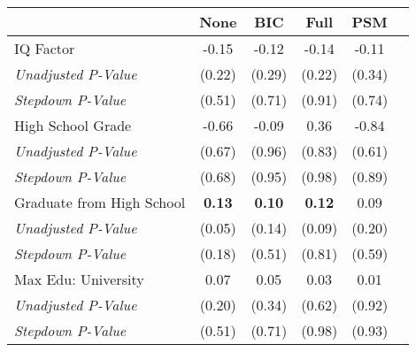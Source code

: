 \begin{tabular}{l c c c c c}
\toprule
 & None & BIC & Full & PSM \\
\midrule
IQ Factor & -0.15 & -0.12 & -0.14 & -0.11 \\
\quad \textit{Unadjusted P-Value} & (0.22) & (0.29) & (0.22) & (0.34) \\
\quad \textit{Stepdown P-Value} & (0.51) & (0.71) & (0.91) & (0.74) \\
High School Grade & -0.66 & -0.09 & 0.36 & -0.84 \\
\quad \textit{Unadjusted P-Value} & (0.67) & (0.96) & (0.83) & (0.61) \\
\quad \textit{Stepdown P-Value} & (0.68) & (0.95) & (0.98) & (0.89) \\
Graduate from High School & \textbf{ 0.13 } & \textbf{ 0.10 } & \textbf{ 0.12 } & 0.09 \\
\quad \textit{Unadjusted P-Value} & (0.05) & (0.14) & (0.09) & (0.20) \\
\quad \textit{Stepdown P-Value} & (0.18) & (0.51) & (0.81) & (0.59) \\
Max Edu: University & 0.07 & 0.05 & 0.03 & 0.01 \\
\quad \textit{Unadjusted P-Value} & (0.20) & (0.34) & (0.62) & (0.92) \\
\quad \textit{Stepdown P-Value} & (0.51) & (0.71) & (0.98) & (0.93) \\
\bottomrule
\end{tabular}

